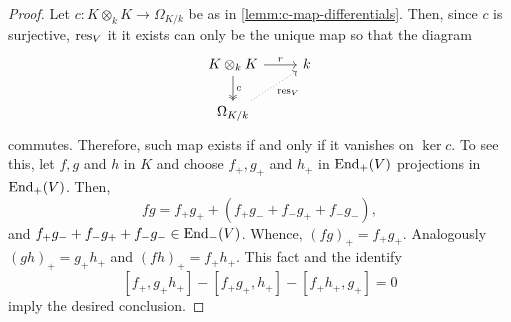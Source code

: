 \begin{proof}
	Let $c\colon K \otimes_{k} K \to \Omega_{K/k}$ be as in \cref{lemm:c-map-differentials}. Then, since $c$ is surjective, $\operatorname{res}_{V}$ it it exists can only be the unique map so that the diagram
	\[
	\begin{tikzcd}
		K \otimes_{k} K \arrow[r, "r"] \arrow[d, two heads, "c"] & k \\
		\Omega_{K/k} \arrow[ur, dotted, swap, "\res_{V}"] &
	\end{tikzcd}
	\]
	commutes. Therefore, such map exists if and only if it vanishes on $\ker c$. To see this, let $f,g$ and $h$ in $K$ and choose $f_{+}, g_{+}$ and $h_{+}$ in $\operatorname{End}_{+}(V)$ projections in $\operatorname{End}_{+}(V)$. Then,
	\[
		fg = f_{+}g_{+} + (f_{+}g_{-} + f_{-}g_{+} + f_{-}g_{-}),
	\]
	and $f_{+}g_{-} + f_{-}g_{+} + f_{-}g_{-} \in \operatorname{End}_{-}(V)$. Whence, $(fg)_{+} = f_{+}g_{+}$. Analogously $(gh)_{+} = g_{+}h_{+}$ and $(fh)_{+} = f_{+}h_{+}$. This fact and the identify
	\[
		[f_{+},g_{+}h_{+}] - [f_{+}g_{+}, h_{+}] - [f_{+}h_{+}, g_{+}] = 0
	\]
	imply the desired conclusion.
\end{proof}
